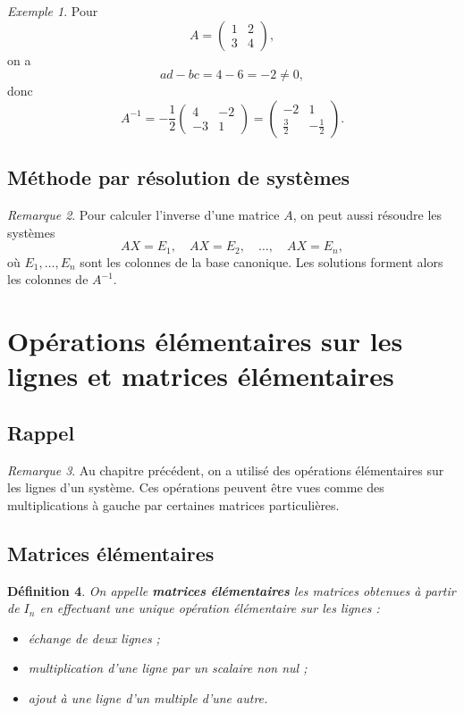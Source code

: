 \documentclass[11pt,a4paper]{article}
\newtheorem{definition}{Définition}[section]
\theoremstyle{remark}
\newtheorem{remarque}[definition]{Remarque}
\newtheorem{exemple}[definition]{Exemple}
\begin{document}
\begin{exemple}
Pour
\[
A=
\begin{pmatrix}
1 & 2\\
3 & 4
\end{pmatrix},
\]
on a
\[
ad-bc=4-6=-2\neq 0,
\]
donc
\[
A^{-1}
=
-\frac12
\begin{pmatrix}
4 & -2\\
-3 & 1
\end{pmatrix}
=
\begin{pmatrix}
-2 & 1\\
\frac32 & -\frac12
\end{pmatrix}.
\]
\end{exemple}

\subsection{Méthode par résolution de systèmes}

\begin{remarque}
Pour calculer l’inverse d’une matrice \(A\), on peut aussi résoudre les systèmes
\[
AX=E_1,\quad AX=E_2,\quad \dots,\quad AX=E_n,
\]
où \(E_1,\dots,E_n\) sont les colonnes de la base canonique. Les solutions forment alors les colonnes de \(A^{-1}\).
\end{remarque}

\section{Opérations élémentaires sur les lignes et matrices élémentaires}

\subsection{Rappel}

\begin{remarque}
Au chapitre précédent, on a utilisé des opérations élémentaires sur les lignes d’un système. Ces opérations peuvent être vues comme des multiplications à gauche par certaines matrices particulières.
\end{remarque}

\subsection{Matrices élémentaires}

\begin{definition}
On appelle \textbf{matrices élémentaires} les matrices obtenues à partir de \(I_n\) en effectuant une unique opération élémentaire sur les lignes :
\begin{itemize}
    \item échange de deux lignes ;
    \item multiplication d’une ligne par un scalaire non nul ;
    \item ajout à une ligne d’un multiple d’une autre.
\end{itemize}
\end{definition}
\end{document}
